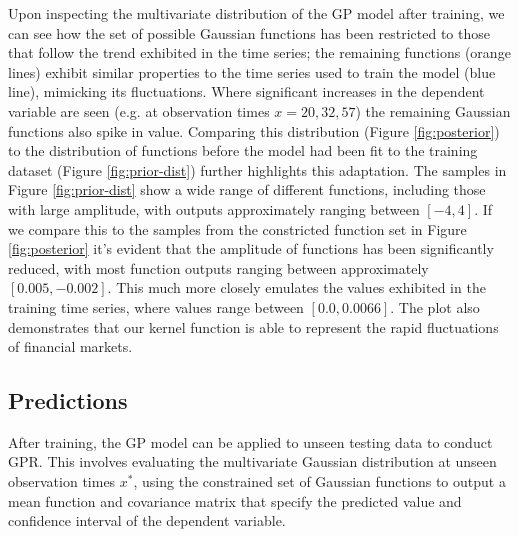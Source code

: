\documentclass[a4paper, 11pt]{article}
\begin{document}
    Upon inspecting the multivariate distribution of the GP model after training, we can see how the set of possible Gaussian functions has been restricted to those that follow the trend exhibited in the time series; the remaining functions (orange lines) exhibit similar properties to the time series used to train the model (blue line), mimicking its fluctuations. Where significant increases in the dependent variable are seen (e.g. at observation times $x = 20, 32, 57$) the remaining Gaussian functions also spike in value. Comparing this distribution (Figure \ref{fig:posterior}) to the distribution of functions before the model had been fit to the training dataset (Figure \ref{fig:prior-dist}) further highlights this adaptation. The samples in Figure \ref{fig:prior-dist} show a wide range of different functions, including those with large amplitude, with outputs approximately ranging between $[-4, 4]$. If we compare this to the samples from the constricted function set in Figure \ref{fig:posterior} it's evident that the amplitude of functions has been significantly reduced, with most function outputs ranging between approximately $[0.005, -0.002]$. This much more closely emulates the values exhibited in the training time series, where values range between $[0.0, 0.0066]$. The plot also demonstrates that our kernel function is able to represent the rapid fluctuations of financial markets.

    \subsection{Predictions}

    After training, the GP model can be applied to unseen testing data to conduct GPR. This involves evaluating the multivariate Gaussian distribution at unseen observation times $x^*$, using the constrained set of Gaussian functions to output a mean function and covariance matrix that specify the predicted value and confidence interval of the dependent variable. 
    
\end{document}
